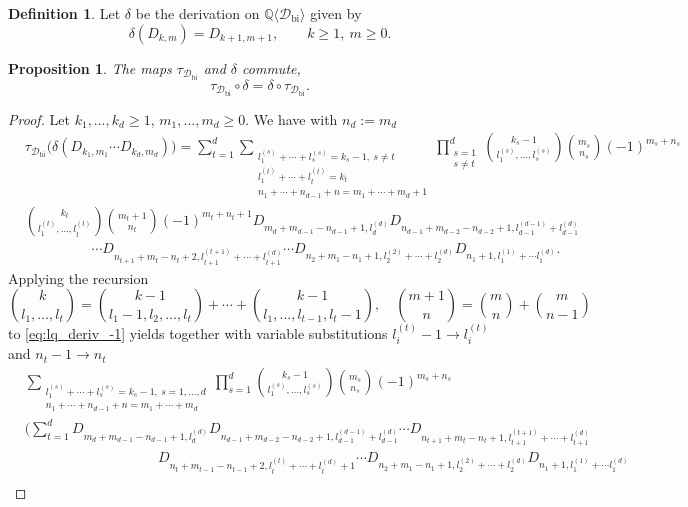 \documentclass[12pt,reqno]{amsart}
\newtheorem{prop}[thm]{Proposition}
\numberwithin{equation}{section}
\theoremstyle{definition}
\newtheorem{defi}[thm]{Definition}
\newcommand{\QQ}{\mathbb{Q}}
\newcommand{\Dbi}{\mathcal{D}_{\operatorname{bi}}}
\newcommand{\QDbi}{\QQ\langle \Dbi\rangle}
\begin{document}
\begin{defi} \label{def:deriv} Let $\delta$ be the derivation on $\QDbi$ given by
\[\delta(D_{k,m})=D_{k+1,m+1},\qquad k\geq1,\ m\geq0.\]
\end{defi}

\begin{prop} \label{prop:d_tau_commute} The maps $\tau_{\Dbi}$ and $\delta$ commute,
\[\tau_{\Dbi}\circ\delta=\delta\circ \tau_{\Dbi}.\]
\end{prop}

\begin{proof}
Let $k_1,\ldots,k_d\geq1$, $m_1,\ldots,m_d\geq0$. We have with $n_d:=m_d$
\begin{align} \label{eq:lq_deriv_-1}
&\tau_{\Dbi}\big(\delta(D_{k_1,m_1}\cdots D_{k_d,m_d})\big)=\sum_{t=1}^d \sum_{\substack{l_1^{(s)}+\cdots+l_s^{(s)}=k_s-1,\ s\neq t \\ l_1^{(t)}+\cdots+l_t^{(t)}=k_t \\ n_1+\cdots+n_{d-1}+n=m_1+\cdots+m_d+1}} \prod_{\substack{s=1 \\ s\neq t}}^d \binom{k_s-1}{l_1^{(s)},\ldots,l_s^{(s)}} \binom{m_s}{n_s}(-1)^{m_s+n_s} \nonumber \\ &\binom{k_t}{l_1^{(t)},\ldots,l_t^{(t)}}\binom{m_t+1}{n_t}(-1)^{m_t+n_t+1}D_{m_d+m_{d-1}-n_{d-1}+1,l_d^{(d)}}D_{n_{d-1}+m_{d-2}-n_{d-2}+1,l_{d-1}^{(d-1)}+l_{d-1}^{(d)}} \nonumber \\
&\hspace{2cm}\cdots D_{n_{t+1}+m_t-n_t+2,l_{t+1}^{(t+1)}+\cdots+l_{t+1}^{(d)}}\cdots D_{n_2+m_1-n_1+1,l_2^{(2)}+\cdots+l_2^{(d)}}D_{n_1+1,l_1^{(1)}+\cdots l_1^{(d)}}.
\end{align}
Applying the recursion
\[\binom{k}{l_1,\ldots,l_t}=\binom{k-1}{l_1-1,l_2,\ldots,l_t}+\cdots+\binom{k-1}{l_1,\ldots,l_{t-1},l_t-1},\quad \binom{m+1}{n}=\binom{m}{n}+\binom{m}{n-1}\]
to \eqref{eq:lq_deriv_-1} yields together with variable substitutions $l_i^{(t)}-1\to l_i^{(t)}$ and $n_t-1\to n_t$
\begin{align} \label{eq:lq_deriv-2}
&\sum_{\substack{l_1^{(s)}+\cdots+l_s^{(s)}=k_s-1,\ s=1,\ldots,d \\ n_1+\cdots+n_{d-1}+n=m_1+\cdots+m_d}}  \prod_{s=1}^d \binom{k_s-1}{l_1^{(s)},\ldots,l_s^{(s)}} \binom{m_s}{n_s}(-1)^{m_s+n_s}\\
&\Bigg(\sum_{t=1}^dD_{m_d+m_{d-1}-n_{d-1}+1,l_d^{(d)}}D_{n_{d-1}+m_{d-2}-n_{d-2}+1,l_{d-1}^{(d-1)}+l_{d-1}^{(d)}}\cdots D_{n_{t+1}+m_t-n_t+1,l_{t+1}^{(t+1)}+\cdots+l_{t+1}^{(d)}} \nonumber \\
&\hspace{4cm} D_{n_t+m_{t-1}-n_{t-1}+2,l_t^{(t)}+\cdots+l_t^{(d)}+1}\cdots D_{n_2+m_1-n_1+1,l_2^{(2)}+\cdots+l_2^{(d)}}D_{n_1+1,l_1^{(1)}+\cdots l_1^{(d)}} \nonumber \\

\end{align}
\end{proof}
\end{document}
